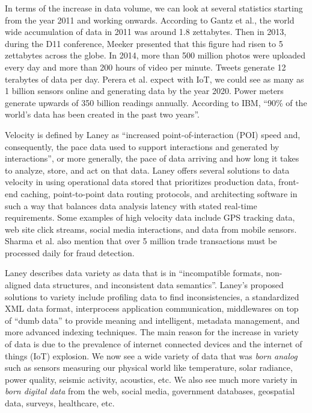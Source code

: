\documentclass[]{article}
\begin{document}
In terms of the increase in data volume, we can look at several statistics starting from the year 2011 and working onwards. According to Gantz et al.\cite{gantz_extracting_2011}, the world wide accumulation of data in 2011  was around 1.8 zettabytes. Then in 2013, during the D11 conference, Meeker presented that this figure had risen to 5 zettabytes across the globe. In 2014, more than 500 million photos were uploaded every day and more than 200 hours of video per minute\cite{pcast}. Tweets generate 12 terabytes of data per day\cite{sharma_extended_2015}.  Perera et al.\cite{perera_sensing_2014} expect with IoT, we could see as many as 1 billion sensors online and generating data by the year 2020. Power meters generate upwards of 350 billion readings annually\cite{sharma_extended_2015}. According to IBM\cite{ibm}, ``90\% of the world's data has been created in the past two years''. 

Velocity is defined by Laney as ``increased point-of-interaction (POI) speed and, consequently, the pace data used to support interactions and generated by interactions'', or more generally, the pace of data arriving and how long it takes to analyze, store, and act on that data. Laney offers several solutions to data velocity in using operational data stored that prioritizes production data, front-end caching, point-to-point data routing protocols, and architecting software in such a way that balances data analysis latency with stated real-time requirements. Some examples of high velocity data include GPS tracking data, web site click streams, social media interactions, and data from mobile sensors\cite{pcast}. Sharma et al.\cite{sharma_extended_2015} also mention that over 5 million trade transactions must be processed daily for fraud detection. 

Laney describes data variety as data that is in ``incompatible formats, non-aligned data structures, and inconsistent data semantics''. Laney's proposed solutions to variety include profiling data to find inconsistencies, a standardized XML data format, interprocess application communication, middlewares on top of ``dumb data'' to provide meaning and intelligent, metadata management, and more advanced indexing techniques. The main reason for the increase in variety of data is due to the prevalence of internet connected devices and the internet of things (IoT) explosion. We now see a wide variety of data that was \textit{born analog} such as sensors measuring our physical world like temperature, solar radiance, power quality, seismic activity, acoustics, etc. We also see much more variety in \textit{born digital data} from the web, social media, government databases, geospatial data, surveys, healthcare, etc\cite{pcast}.
\end{document}

